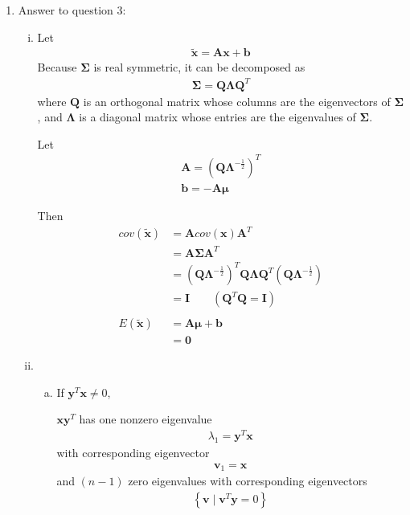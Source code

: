 \documentclass[12pt]{article}
\begin{document}
\begin{enumerate}
\begin{enumerate}[(i)]
\end{enumerate}

\item Answer to question 3:
\begin{enumerate}[(i)]
\item
Let
\begin{align}
    \boldsymbol{\tilde{x}} = \mathbf{A} \boldsymbol{x} + \mathbf{b}
\end{align}
Because $ \mathbf{\Sigma}$ is real symmetric, it can be decomposed as
\begin{align}
    \mathbf{\Sigma} = \mathbf{Q} \mathbf{\Lambda} \mathbf{Q}^T
\end{align}
where $\mathbf{Q}$ is an orthogonal matrix whose columns are the eigenvectors of $\mathbf{\Sigma}$, and $\mathbf{\Lambda}$ is a diagonal matrix whose entries are the eigenvalues of $\mathbf{\Sigma}$.

Let 
\begin{gather}
    \mathbf{A} = (\mathbf{Q} \mathbf{\Lambda}^{-\frac{1}{2}})^T \\
    \mathbf{b} = -\mathbf{A} \boldsymbol{\mu}
\end{gather}

Then
\begin{align}
    cov(\boldsymbol{\tilde{x}}) 
    & = \mathbf{A} cov(\boldsymbol{x}) \mathbf{A}^T \\
    & = \mathbf{A} \mathbf{\Sigma} \mathbf{A}^T \\
    & = (\mathbf{Q} \mathbf{\Lambda}^{-\frac{1}{2}})^T \mathbf{Q} \mathbf{\Lambda} \mathbf{Q}^T (\mathbf{Q} \mathbf{\Lambda}^{-\frac{1}{2}}) \\
    & = \mathbf{I} \qquad (\mathbf{Q}^T \mathbf{Q} = \mathbf{I}) \\
    \\
    E(\boldsymbol{\tilde{x}}) 
    & = \mathbf{A} \boldsymbol{\mu} + \mathbf{b} \\
    & = \mathbf{0}
\end{align}

\item


\begin{enumerate}[a)]
\item
If $\boldsymbol{y}^T\boldsymbol{x} \ne 0$,

$\boldsymbol{x}\boldsymbol{y}^T$ has one nonzero eigenvalue
\begin{gather}
    \lambda_1 = \boldsymbol{y}^T\boldsymbol{x}
\end{gather}
with corresponding eigenvector
\begin{gather}
    \boldsymbol{v}_1 = \boldsymbol{x}
\end{gather}
and $(n-1)$ zero eigenvalues with corresponding eigenvectors
\begin{gather}
    \left\{\boldsymbol{v} \;|\; \boldsymbol{v}^T \boldsymbol{y} = 0 \right\}
\end{gather}


\end{enumerate}
\end{enumerate}
\end{enumerate}
\end{document}
